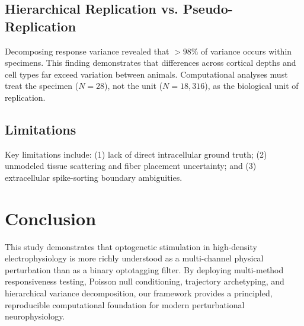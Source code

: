\documentclass[10pt,journal,compsoc]{IEEEtran}
\begin{document}
\subsection{Hierarchical Replication vs. Pseudo-Replication}
Decomposing response variance revealed that $>98\%$ of variance occurs within specimens. This finding demonstrates that differences across cortical depths and cell types far exceed variation between animals. Computational analyses must treat the specimen ($N=28$), not the unit ($N=18,316$), as the biological unit of replication.

\subsection{Limitations}
Key limitations include: (1) lack of direct intracellular ground truth; (2) unmodeled tissue scattering and fiber placement uncertainty; and (3) extracellular spike-sorting boundary ambiguities.

\section{Conclusion}
This study demonstrates that optogenetic stimulation in high-density electrophysiology is more richly understood as a multi-channel physical perturbation than as a binary optotagging filter. By deploying multi-method responsiveness testing, Poisson null conditioning, trajectory archetyping, and hierarchical variance decomposition, our framework provides a principled, reproducible computational foundation for modern perturbational neurophysiology.

\end{document}
